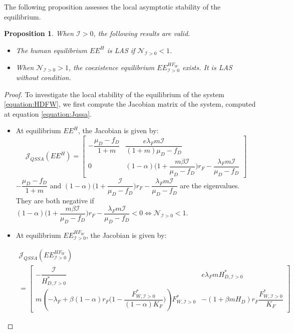 \documentclass{article}
\newcommand{\lfw}{\lambda_{F}}
\newcommand{\lfw}{\lambda_{F}}
\newcommand{\cI}{\mathcal{I}}
\newtheorem{prop}{Proposition}
\begin{document}
The following proposition assesses the local asymptotic stability of the equilibrium.

\begin{prop} \label{prop:stab 2D, cI>0}
When $\cI > 0$, the following results are valid.
\begin{itemize}
\item The human equilibrium $EE^{H}$ is LAS if $\mathcal{N}_{\cI > 0} < 1$.
\item When $\mathcal{N}_{\cI > 0} > 1$, the coexistence equilibrium $EE^{HF_W}_{\cI > 0}$ exists. It is LAS without condition.
\end{itemize}
\end{prop}


\begin{proof}
To investigate the local stability of the equilibrium of the system \eqref{equation:HDFW}, we first compute the Jacobian matrix of the system, computed at equation \eqref{equation:Jqssa}.

\begin{itemize}
\item At equilibrium $EE^{H}$, the Jacobian is given by:
\begin{equation*}
\mathcal{J}_{QSSA}(EE^{H}) = \begin{bmatrix}
-\dfrac{\mu_D - f_D}{1 + m} &  \dfrac{e \lfw m \cI}{(1+m)\mu_D - f_D} \\
0 & (1-\alpha)\Big(1+ \dfrac{m \beta \cI}{\mu_D - f_D}\Big)  r_F -  \dfrac{\lfw m  \cI}{\mu_D - f_D}
\end{bmatrix}
\end{equation*}
$-\dfrac{\mu_D - f_D}{1 + m} $ and $(1-\alpha)\Big(1+ \dfrac{\cI}{\mu_D - f_D}\Big)  r_F -  \dfrac{\lfw m  \cI}{\mu_D - f_D}$ are the eigenvalues. They are both negative if $(1-\alpha)\Big(1+ \dfrac{m \beta \cI}{\mu_D - f_D}\Big)  r_F -  \dfrac{\lfw m  \cI}{\mu_D - f_D} <0 \Leftrightarrow \mathcal{N}_{\cI > 0} < 1$.


\item At equilibrium $EE^{HF_W}_{\cI > 0}$, the Jacobian is given by:

\begin{multline*}
\mathcal{J}_{QSSA}(EE^{HF_W}_{\cI > 0}) \\= \begin{bmatrix}
-\dfrac{\cI}{H^*_{D, \cI > 0}} & e \lfw m H^*_{D, \cI > 0} \\
m\left(-\lfw + \beta (1-\alpha) r_F \Big(1- \dfrac{F^*_{W, \cI > 0}}{(1-\alpha)K_F} \Big) \right) F^*_{W, \cI > 0} & -(1+\beta m H_D) r_F \dfrac{F^*_{W, \cI > 0}}{K_F} 
\end{bmatrix}
\end{multline*}


\end{itemize}
\end{proof}
\end{document}
